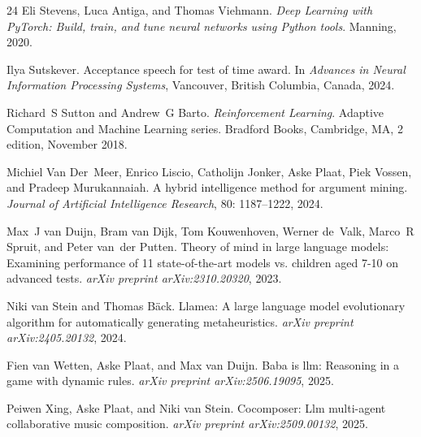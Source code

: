 \begin{thebibliography}{24}
Eli Stevens, Luca Antiga, and Thomas Viehmann.
\newblock \emph{Deep Learning with PyTorch: Build, train, and tune neural networks using Python tools}.
\newblock Manning, 2020.

Ilya Sutskever.
\newblock Acceptance speech for test of time award.
\newblock In \emph{Advances in Neural Information Processing Systems}, Vancouver, British Columbia, Canada, 2024.

Richard~S Sutton and Andrew~G Barto.
\newblock \emph{Reinforcement Learning}.
\newblock Adaptive Computation and Machine Learning series. Bradford Books, Cambridge, MA, 2 edition, November 2018.

Michiel Van Der~Meer, Enrico Liscio, Catholijn Jonker, Aske Plaat, Piek Vossen, and Pradeep Murukannaiah.
\newblock A hybrid intelligence method for argument mining.
\newblock \emph{Journal of Artificial Intelligence Research}, 80: 1187--1222, 2024.

Max~J van Duijn, Bram van Dijk, Tom Kouwenhoven, Werner de~Valk, Marco~R Spruit, and Peter van~der Putten.
\newblock Theory of mind in large language models: Examining performance of 11 state-of-the-art models vs. children aged 7-10 on advanced tests.
\newblock \emph{arXiv preprint arXiv:2310.20320}, 2023.

Niki van Stein and Thomas B{\"a}ck.
\newblock Llamea: A large language model evolutionary algorithm for automatically generating metaheuristics.
\newblock \emph{arXiv preprint arXiv:2405.20132}, 2024.

Fien van Wetten, Aske Plaat, and Max van Duijn.
\newblock Baba is llm: Reasoning in a game with dynamic rules.
\newblock \emph{arXiv preprint arXiv:2506.19095}, 2025.

Peiwen Xing, Aske Plaat, and Niki van Stein.
\newblock Cocomposer: Llm multi-agent collaborative music composition.
\newblock \emph{arXiv preprint arXiv:2509.00132}, 2025.

\end{thebibliography}
